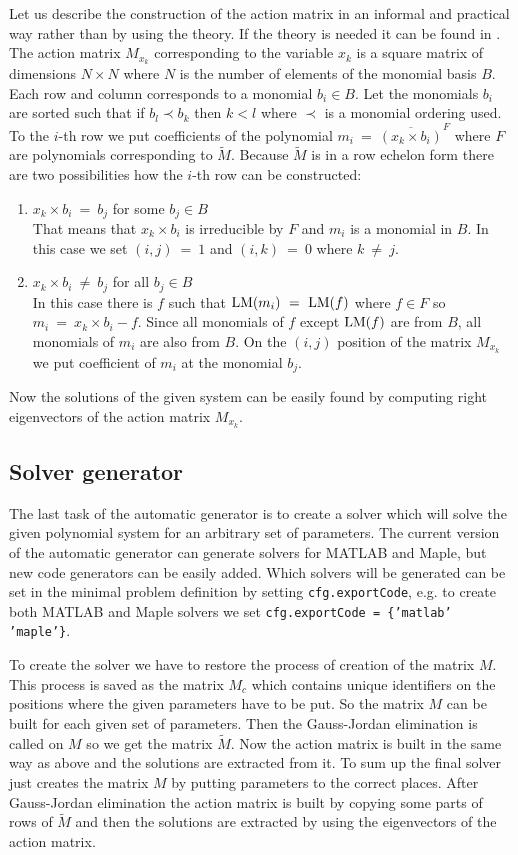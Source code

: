 Let us describe the construction of the action matrix in an informal and practical way rather than by using the theory. If the theory is needed it can be found in \cite{KukelovaAlgMethods}. The action matrix $M_{x_k}$ corresponding to the variable $x_k$ is a square matrix of dimensions $N \times N$ where $N$ is the number of elements of the monomial basis $B$. Each row and column corresponds to a monomial $b_i \in B$. Let the monomials $b_i$ are sorted such that if $b_l \prec b_k$ then $k < l$ where $\prec$ is a monomial ordering used. To the $i$-th row we put coefficients of the polynomial $m_i\ =\ \overline{(x_k \times b_i)}^F$ where $F$ are polynomials corresponding to $\tilde{M}$. Because $\tilde{M}$ is in a row echelon form there are two possibilities how the $i$-th row can be constructed:
\begin{enumerate}
  \item $x_k \times b_i\ =\ b_j$ for some $b_j \in B$\\
        That means that $x_k \times b_i$ is irreducible by $F$ and $m_i$ is a monomial in $B$. In this case we set $(i, j)\ =\ 1$ and $(i, k)\ =\ 0$ where $k\ \neq\ j$.
  \item $x_k \times b_i\ \neq\ b_j$ for all $b_j \in B$\\
	  In this case there is $f$ such that $\operatorname{LM}(m_i)\ =\ \operatorname{LM}(f)$ where $f \in F$ so $m_i\ =\ x_k\times b_i - f$. Since all monomials of $f$ except $\operatorname{LM}(f)$ are from $B$, all monomials of $m_i$ are also from $B$. On the $(i, j)$ position of the matrix $M_{x_k}$ we put coefficient of $m_i$ at the monomial $b_j$.
\end{enumerate}

Now the solutions of the given system can be easily found by computing right eigenvectors of the action matrix $M_{x_k}$.

\subsection{Solver generator}
The last task of the automatic generator is to create a solver which will solve the given polynomial system for an arbitrary set of parameters. The current version of the automatic generator can generate solvers for MATLAB and Maple, but new code generators can be easily added. Which solvers will be generated can be set in the minimal problem definition by setting \texttt{cfg.exportCode}, e.g. to create both MATLAB and Maple solvers we set \texttt{cfg.exportCode = \{'matlab' 'maple'\}}.

To create the solver we have to restore the process of creation of the matrix $M$. This process is saved as the matrix $M_c$ which contains unique identifiers on the positions where the given parameters have to be put. So the matrix $M$ can be built for each given set of parameters. Then the Gauss-Jordan elimination is called on $M$ so we get the matrix $\tilde{M}$. Now the action matrix is built in the same way as above and the solutions are extracted from it. To sum up the final solver just creates the matrix $M$ by putting parameters to the correct places. After Gauss-Jordan elimination the action matrix is built by copying some parts of rows of $\tilde{M}$ and then the solutions are extracted by using the eigenvectors of the action matrix.

